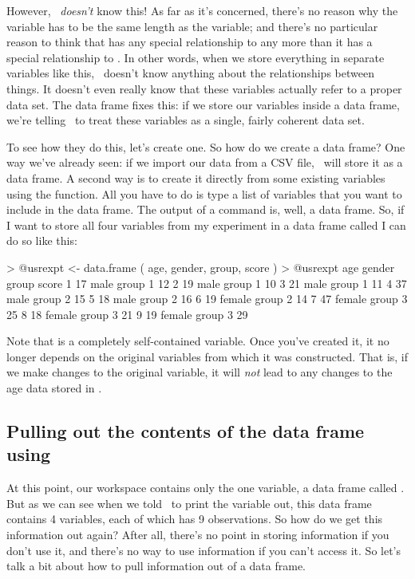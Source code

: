 However, \R\ {\it doesn't} know this! As far as it's concerned, there's no reason why the  variable has to be the same length as the  variable; and there's no particular reason to think that  has any special relationship to  any more than it has a special relationship to . In other words, when we store everything in separate variables like this, \R\ doesn't know anything about the relationships between things. It doesn't even really know that these variables actually refer to a proper data set. The data frame fixes this: if we store our variables inside a data frame, we're telling \R\ to treat these variables as a single, fairly coherent data set. 

To see how they do this, let's create one. So how do we create a data frame? One way we've already seen: if we import our data from a CSV file, \R\ will store it as a data frame. A second way is to create it directly from some existing variables using the  function. All you have to do is type a list of variables that you want to include in the data frame. The output of a  command is, well, a data frame. So, if I want to store all four variables from my experiment in a data frame called  I can do so like this:
\begin{rblock1}
> @usr{expt <- data.frame ( age, gender, group, score )} 
> @usr{expt} 
  age gender   group score
1  17   male group 1    12
2  19   male group 1    10
3  21   male group 1    11
4  37   male group 2    15
5  18   male group 2    16
6  19 female group 2    14
7  47 female group 3    25
8  18 female group 3    21
9  19 female group 3    29
\end{rblock1}
Note that  is a completely self-contained variable. Once you've created it, it no longer depends on the original variables from which it was constructed. That is, if we make changes to the original  variable, it will {\it not} lead to any changes to the age data stored in . 



\subsection{Pulling out the contents of the data frame using \rtext{\$}}

At this point, our workspace contains only the one variable, a data frame called . But as we can see when we told \R\ to print the variable out, this data frame contains 4 variables, each of which has 9 observations. So how do we get this information out again? After all, there's no point in storing information if you don't use it, and there's no way to use information if you can't access it. So let's talk a bit about how to pull information out of a data frame. 

